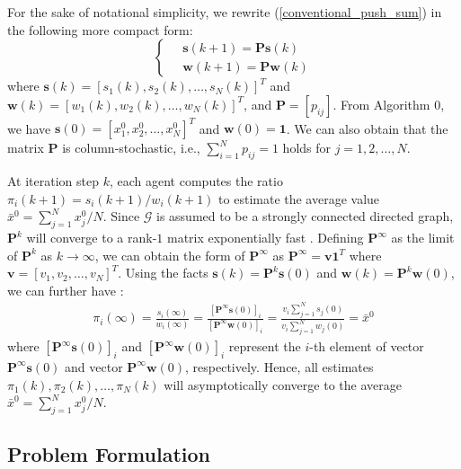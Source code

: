 \documentclass{IEEEtran}
\begin{document}
For the sake of notational simplicity, we rewrite (\ref{conventional_push_sum}) in the following more compact form:
\begin{equation}\label{conventional_push_sum_vector_form}
\left\lbrace \begin{aligned}
& \ \mathbf{s}(k+1) =\mathbf{P} \mathbf{s}(k)\\
& \ \mathbf{w}(k+1) = \mathbf{P} \mathbf{w}(k)
\end{aligned} \right.
\end{equation}
where $\mathbf{s}(k)= [s_1(k), s_2(k), \ldots, s_N(k)] ^T$ and $\mathbf{w}(k)= [w_1(k), w_2(k), \ldots, w_N(k)]^T$, and $\mathbf{P}=[p_{ij}]$. From Algorithm 0, we have $\mathbf{s}(0)= [x_1^0, x_2^0, \ldots, x_N^0] ^T$ and $\mathbf{w}(0)= \mathbf{1}$. We can also obtain that the matrix $\mathbf{P}$ is column-stochastic, i.e., $\sum_{i=1}^N p_{ij}=1$ holds for $j=1, 2, \ldots, N$.

At iteration step $k$, each agent computes the ratio $\pi_i(k+1)=s_i(k+1)/w_i(k+1)$ to estimate the average value $\bar{x}^0={\sum_{j=1}^{N}x_j^0}/N$. Since $\mathcal{G}$ is assumed to be a strongly connected directed graph, $\mathbf{P}^k$ will converge to a rank-$1$ matrix exponentially fast \cite{Seneta_Markov_book, fill1991eigenvalue}. Defining $\mathbf{P}^\infty$ as the limit of $\mathbf{P}^k$ as $k \rightarrow \infty$, we can obtain the form of $\mathbf{P}^\infty$ as $\mathbf{P}^\infty=\mathbf{v} \mathbf{1}^T$ where $\mathbf{v}=[v_1, v_2, \ldots, v_N]^T$. Using the facts $\mathbf{s}(k)=\mathbf{P}^k \mathbf{s}(0)$ and $\mathbf{w}(k)=\mathbf{P}^k \mathbf{w}(0)$, we can further have \cite{hadjicostis2018distributed}:
\begin{equation}\label{conventional_push_sum_convergence}
\begin{aligned}
\pi_i(\infty)= \frac{s_i(\infty)}{w_i(\infty)}=\frac{ [\mathbf{P}^\infty \mathbf{s}(0)]_i}{[\mathbf{P}^\infty \mathbf{w}(0)]_i}= \frac{v_i \sum_{j=1}^{N} s_j(0)}{v_i \sum_{j=1}^{N} w_j(0)}=\bar{x}^0
\end{aligned}
\end{equation}
where $[\mathbf{P}^\infty \mathbf{s}(0)]_i$ and $[\mathbf{P}^\infty \mathbf{w}(0)]_i$ represent the $i$-th element of vector $\mathbf{P}^\infty \mathbf{s}(0)$ and vector $\mathbf{P}^\infty \mathbf{w}(0)$, respectively. Hence, all estimates $\pi_1(k), \pi_2(k), \ldots, \pi_N(k)$ will asymptotically converge to the average $\bar{x}^0={\sum_{j=1}^{N}x_j^0}/N$.

\subsection{Problem Formulation}
\end{document}
